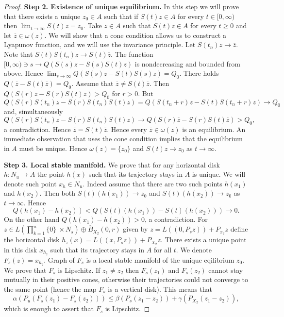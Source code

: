 \documentclass[11pt, leqno]{amsart}
\theoremstyle{definition}
\begin{document}
\begin{proof}
	
	
	\textbf{Step 2. Existence of unique equilibrium.} In this step we will prove that  there exists a unique $z_0 \in A$ such that if $S(t)z \in A$ for every $t\in [0,\infty)$ then $\lim_{t\to \infty}S(t)z = z_0$.
	Take $z\in A$ such that $S(t)z\in A$ for every $t\geq 0$ and let $\overline{z} \in \omega(z)$. We will show that a cone condition allows us to construct a Lyapunov function, and we will use the invariance principle. Let $S(t_n)z\to \overline{z}$. Note that $S(t)S(t_n)z \to S(t)\overline{z}$.
	The function
	$[0,\infty) \ni s\to Q(S(s)z - S(s)S(t)z)$ is nondecreasing and bounded from above. Hence $\lim_{s\to \infty} Q(S(s)z - S(t)S(s)z) = Q_0$. There holds $Q(\overline{z}-S(t)\overline{z}) = Q_0$. Assume that $\overline{z}\neq S(t)\overline{z}$. Then $Q(S(r)\overline{z}-S(r)S(t)\overline{z}) > Q_0$ for $r>0$.
	But
	$$ Q(S(r)S(t_n)z - S(r)S(t_n)S(t)z) = Q(S(t_n+r)z - S(t)S(t_n+r)z) \to Q_0$$
	and, simultaneously
	$$
	Q(S(r)S(t_n)z - S(r)S(t_n)S(t)z) \to Q(S(r)\overline{z}-S(r)S(t)\overline{z}) > Q_0,
	$$
	a contradiction. Hence $\overline{z}= S(t)\overline{z}$. Hence every $\overline{z} \in \omega(z)$ is an equilibrium. An immediate observation that uses the cone condition implies
	that the  equilibrium in $A$ must be unique. Hence $\omega(z) = \{z_0\}$ and $S(t)z \to z_0$ as $t\to \infty$.
	
	
	\textbf{Step 3. Local stable manifold.} We prove that for any horizontal disk $h:N_u\to A$ the point $h(x)$ such that its trajectory stays in $A$ is unique. We will denote such point $x_h\in N_u$. Indeed assume that
	there are two such points $h({x}_1)$ and $h({x}_2)$. Then both $S(t)(h({x}_1)) \to z_0$ and $S(t)(h({x}_2)) \to z_0$ as $t\to \infty$. Hence
	$$
	Q(h({x}_1) - h({x}_2)) < Q(S(t)(h({x}_1)) - S(t)(h({x}_2))) \to 0.
	$$
	On the other hand $Q(h({x}_1)-h({x}_2))>0$, a contradiction.
	For $z\in L \left( \prod_{k=1}^{u} \{ 0 \}\ \times N_s\right) \oplus \overline{B}_{X_2}(0,r)$ given by $z = L((0,P_s z)) + P_{x_2}z$ define the horizontal disk $h_z(x) = L((x,P_s z)) + P_{X_2}z$. There exists a unique point in this disk $x_{h_z}$ such that its trajectory stays in $A$ for all $t$. We denote $F_s(z) = x_{h_z}$. Graph of $F_s$ is a local stable manifold of the unique eqilibrium $z_0$. We prove that $F_s$ is Lipschitz. If $z_1\neq z_2$ then $F_s(z_1)$ and $F_s(z_2)$ cannot stay mutually in their positive cones, otherwise their trajectories could not converge to the same point (hence the map $F_s$ is a vertical disk). This means that
	$$
	\alpha(P_u(F_s(z_1) - F_s(z_2))) \leq \beta(P_s (z_1-z_2)) + \gamma(P_{X_2}(z_1-z_2)),
	$$
	which is enough to assert that $F_s$ is Lipschitz.
	

\end{proof}
\end{document}
